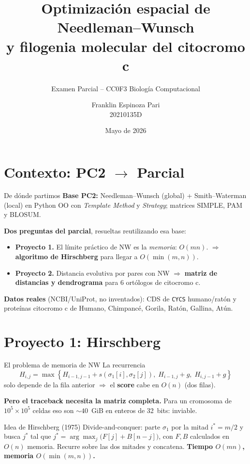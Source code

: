 \documentclass[10pt,aspectratio=169]{beamer}
\title{Optimizaci\'on espacial de Needleman--Wunsch \\
       y filogenia molecular del citocromo c}
\subtitle{Examen Parcial -- CC0F3 Biolog\'ia Computacional}
\author{Franklin Espinoza Pari \\ \small 20210135D}
\institute{Universidad Nacional de Ingenier\'ia}
\date{Mayo de 2026}
\begin{document}
\maketitle

\section{Contexto: PC2 \(\to\) Parcial}

\begin{frame}{De d\'onde partimos}
\textbf{Base PC2:} Needleman--Wunsch (global) + Smith--Waterman (local) en Python OO con \emph{Template Method} y \emph{Strategy}; matrices SIMPLE, PAM y BLOSUM.

\bigskip
\textbf{Dos preguntas del parcial}, resueltas reutilizando esa base:

\begin{itemize}
  \item \textbf{Proyecto 1.} El l\'imite pr\'actico de NW es la \emph{memoria}: $O(mn)$.
        $\Rightarrow$ \textbf{algoritmo de Hirschberg} para llegar a $O(\min(m,n))$.
  \item \textbf{Proyecto 2.} Distancia evolutiva por pares con NW $\Rightarrow$
        \textbf{matriz de distancias y dendrograma} para 6 ort\'ologos de citocromo c.
\end{itemize}

\bigskip
\textbf{Datos reales} (NCBI/UniProt, no inventados): CDS de \texttt{CYCS} humano/rat\'on y prote\'inas citocromo c de Humano, Chimpanc\'e, Gorila, Rat\'on, Gallina, At\'un.
\end{frame}

\section{Proyecto 1: Hirschberg}

\begin{frame}{El problema de memoria de NW}
La recurrencia
\[
H_{i,j} = \max\!\left\{H_{i-1,j-1}+s(\sigma_1[i],\sigma_2[j]),\; H_{i-1,j}+g,\; H_{i,j-1}+g\right\}
\]
solo depende de la fila anterior $\Rightarrow$ el \textbf{score} cabe en $O(n)$ (dos filas).

\medskip
\textbf{Pero el traceback necesita la matriz completa.} Para un cromosoma de $10^5{\times}10^5$ celdas eso son $\sim 40$~GiB en enteros de 32~bits: inviable.

\bigskip
\begin{block}{Idea de Hirschberg (1975)}
Divide-and-conquer: parte $\sigma_1$ por la mitad $i^* = m/2$ y busca $j^*$ tal que
$j^* = \arg\max_j\bigl(F[j] + B[n-j]\bigr)$, con $F, B$ calculados en $O(n)$ memoria.
Recurre sobre las dos mitades y concatena. \textbf{Tiempo $O(mn)$, memoria $O(\min(m,n))$.}
\end{block}
\end{frame}
\end{document}
